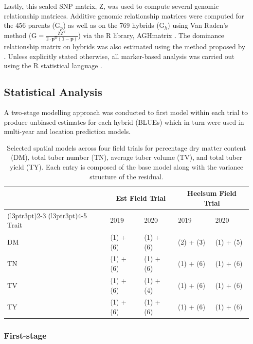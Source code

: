\begin{refsection}
Lastly, this scaled SNP matrix, \(\mathrm Z\), was used to compute several genomic relationship matrices. Additive genomic relationship matrices were computed for the 456 parents (\(\mathrm G_p\)) as well as on the 769 hybrids (\(\mathrm G_h\)) using Van Raden's method (\(\mathrm{G = \frac{ZZ^T}{2\cdot \mathbf{p^T(1-p)}}}\)) \parencite{VanRaden2008} via the R library, AGHmatrix \parencite{Amadeu2016}. The dominance relationship matrix on hybrids was also estimated using the method proposed by \parencite{Su2012}. Unless explicitly stated otherwise, all marker-based analysis was carried out using the R statistical language \parencite{R2022}.

\subsection{Statistical Analysis}

A two-stage modelling approach was conducted to first model within each trial to produce unbiased estimates for each hybrid (BLUEs) which in turn were used in multi-year and location prediction models.

\begin{table}[H]
\caption{Selected spatial models across four field trials for percentage dry matter content (DM), total tuber number (TN), average tuber volume (TV), and total tuber yield (TY). Each entry is composed of the base model along with the variance structure of the residual.}
\label{tbl:spatial-model}
\centering
\begin{tabular}{lllll}
\toprule
\multicolumn{1}{c}{} & \multicolumn{2}{c}{Est Field Trial} & \multicolumn{2}{c}{Heelsum Field Trial} \\
\cmidrule(l{3pt}r{3pt}){2-3} \cmidrule(l{3pt}r{3pt}){4-5}
Trait & 2019 & 2020 & 2019 & 2020\\
\midrule
DM & (1) + (6) & (1) + (6) & (2) + (3) & (1) + (5)\\
TN & (1) + (6) & (1) + (6) & (1) + (6) & (1) + (6)\\
TV & (1) + (6) & (1) + (4) & (1) + (6) & (1) + (6)\\
TY & (1) + (6) & (1) + (6) & (1) + (6) & (1) + (6)\\
\bottomrule
\end{tabular}
\end{table}

\subsubsection{First-stage}


\end{refsection}
